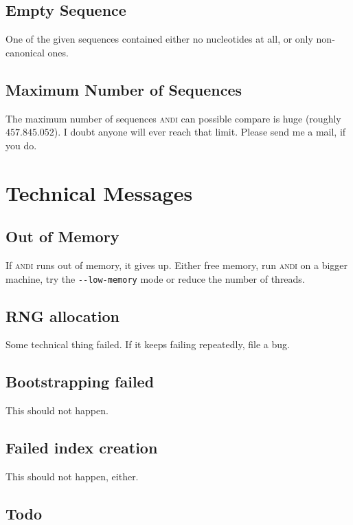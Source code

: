 \documentclass[a4paper,
  10pt,
  english,
  DIV=12,
  BCOR=8mm]{scrbook}
\newcommand{\algo}[1]{\textsc{{#1}}}
\newcommand{\andi}{\algo{andi}\xspace}
\begin{document}
\subsection*{Empty Sequence}

One of the given sequences contained either no nucleotides at all, or only non-canonical ones.

\subsection*{Maximum Number of Sequences}

The maximum number of sequences \andi can possible compare is huge (roughly $457.845.052$). I doubt anyone will ever reach that limit. Please send me a mail, if you do.

\section{Technical Messages}


\subsection*{Out of Memory}

If \andi runs out of memory, it gives up. Either free memory, run \andi on a bigger machine, try the \lstinline$--low-memory$ mode or reduce the number of threads.

\subsection*{RNG allocation}

Some technical thing failed. If it keeps failing repeatedly, file a bug.

\subsection*{Bootstrapping failed}

This should not happen.

\subsection*{Failed index creation}

This should not happen, either.


\subsection*{Todo}
\end{document}
